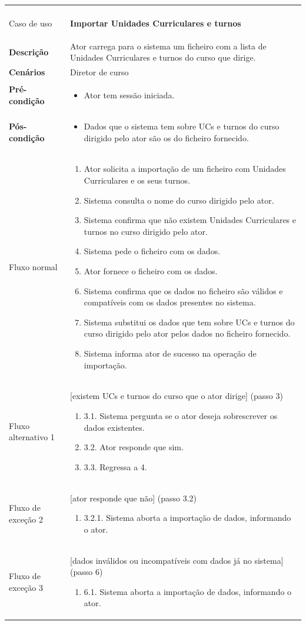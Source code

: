 \documentclass[12pt, a4paper]{article}
\newenvironment{condition}{
    \begin{itemize}[wide=0pt]
        \vspace{-0.2cm}
}{
        \vspace{-0.5cm}
    \end{itemize}
}
\newcommand\flow[1]{
    Fluxo normal &
    \vspace{-0.9cm}
    \singlespacing
    \begin{enumerate}[wide=0pt]
        #1
        \vspace{-0.3cm}
    \end{enumerate} \\ \hline
}
\newcommand\otherflow[3]{
    #1 &
    #2
    \singlespacing
    \begin{enumerate}[wide=0pt]
        #3
        \vspace{-0.3cm}
    \end{enumerate} \\ \hline
}
\newenvironment{usecase}[5]{
    \begin{longtable}{|>{\centering\arraybackslash\bf}m{3cm}|m{13cm}|}
        \multicolumn{2}{c}{\ldots Continua \ldots} \\
        \endfoot
        \endlastfoot

        \hline
        Caso de uso & \textbf{#1} \\

        \hline
        Descrição & #2 \\

        \hline
        Cenários & #3 \\

        \hline
        Pré-condição &
        \vspace{-0.8cm}
        \begin{condition}
            #4
        \end{condition} \\

        \hline
        Pós-condição &
        \vspace{-0.8cm}
        \begin{condition}
            #5
        \end{condition} \\

        \hline
}{
\end{longtable}
}
\begin{document}
\begin{usecase}
    {Importar Unidades Curriculares e turnos}
    {
        Ator carrega para o sistema um ficheiro com a lista de Unidades Curriculares e turnos do
        curso que dirige.
    }
    {Diretor de curso}
    {\item Ator tem sessão iniciada.}
    {
        \item Dados que o sistema tem sobre UCs e turnos do curso dirigido pelo ator são os do
            ficheiro fornecido.
    }

    \flow{
        \item Ator solicita a importação de um ficheiro com Unidades Curriculares e os seus turnos.
        \item Sistema consulta o nome do curso dirigido pelo ator.
        \item Sistema confirma que não existem Unidades Curriculares e turnos no curso dirigido pelo
            ator.
        \item Sistema pede o ficheiro com os dados.
        \item Ator fornece o ficheiro com os dados.
        \item Sistema confirma que os dados no ficheiro são válidos e compatíveis com os dados
            presentes no sistema.
        \item Sistema substitui os dados que tem sobre UCs e turnos do curso dirigido pelo ator
            pelos dados no ficheiro fornecido.
        \item Sistema informa ator de sucesso na operação de importação.
    }

    \otherflow{Fluxo alternativo 1}{[existem UCs e turnos do curso que o ator dirige] (passo 3)}{
        \item[3.1.] Sistema pergunta se o ator deseja sobrescrever os dados existentes.
        \item[3.2.] Ator responde que sim.
        \item[3.3.] Regressa a 4.
    }

    \otherflow{Fluxo de exceção 2}{[ator responde que não] (passo 3.2)}{
        \item[3.2.1.] Sistema aborta a importação de dados, informando o ator.
    }

    \otherflow{Fluxo de exceção 3}
        {[dados inválidos ou incompatíveis com dados já no sistema] (passo 6)}{

        \item[6.1.] Sistema aborta a importação de dados, informando o ator.
    }
\end{usecase}
\end{document}
